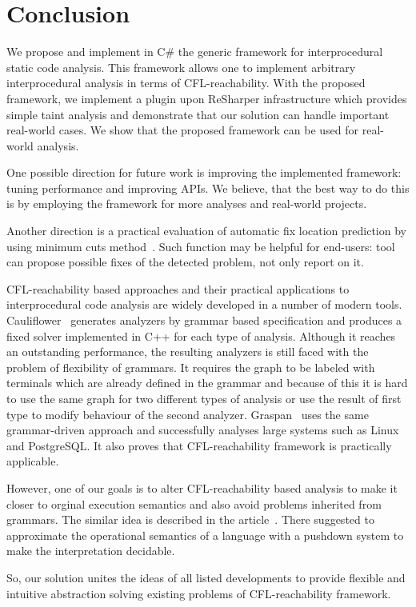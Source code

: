 \section{Conclusion}

We propose and implement in C\# the generic framework for interprocedural static code analysis.
This framework allows one to implement arbitrary interprocedural analysis in terms of CFL-reachability.
With the proposed framework, we implement a plugin upon ReSharper infrastructure which provides simple taint analysis and demonstrate that our solution can handle important real-world cases.
We show that the proposed framework can be used for real-world analysis.

One possible direction for future work is improving the implemented framework: tuning performance and improving APIs. 
We believe, that the best way to do this is by employing the framework for more analyses and real-world projects. 

Another direction is a practical evaluation of automatic fix location prediction by using minimum cuts method~\cite{10.1007/978-3-319-63390-9_27}.
Such function may be helpful for end-users: tool can propose possible fixes of the detected problem, not only report on it.

CFL-reachability based approaches and their practical applications to interprocedural code analysis are widely developed in a number of modern tools.
Cauliflower~\cite{LPAR-21:Cauliflower_Solver_Generator_for} generates analyzers by grammar based specification and produces a fixed solver implemented in C++ for each type of analysis.
Although it reaches an outstanding performance, the resulting analyzers is still faced with the problem of flexibility of grammars.
It requires the graph to be labeled with terminals which are already defined in the grammar and because of this it is hard to use the same graph for two different types of analysis or use the result of first type to modify behaviour of the second analyzer.
Graspan~\cite{Wang:2017:GSD:3093315.3037744} uses the same grammar-driven approach and successfully analyses large systems such as Linux and PostgreSQL.
It also proves that CFL-reachability framework is practically applicable.

However, one of our goals is to alter CFL-reachability based analysis to make it closer to orginal execution semantics and also avoid problems inherited from grammars.
The similar idea is described in the article~\cite{Facchinetti:2019:HDP:3343145.3310340}.
There suggested to approximate the operational semantics of a language with a pushdown system to make the interpretation decidable.

So, our solution unites the ideas of all listed developments to provide flexible and intuitive abstraction solving existing problems of CFL-reachability framework.
